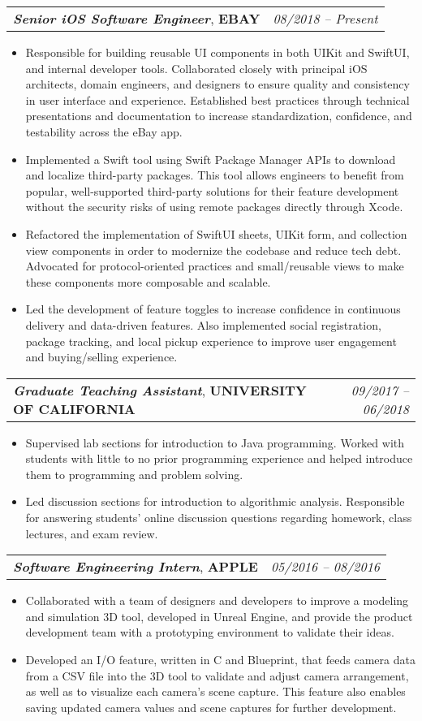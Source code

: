 \documentclass[letterpaper,11pt]{article}
\makeatletter
\newcommand{\resumeItem}[1]{
  \item \small{#1}
}
\newcommand{\resumeExperienceSubheading}[3]{
  \vspace{-1pt}\item
    \begin{tabular*}{0.97\textwidth}[t]{l@{\extracolsep{\fill}}r}
      \textbf{\textit{#1}}, \textbf{#2} & \textit{#3} \\
    \end{tabular*}\vspace{-5pt}
}
\newcommand{\resumeItemListStart}{\begin{itemize}}
\newcommand{\resumeItemListEnd}{\end{itemize}\vspace{-5pt}}
\def\CPlusPlus{{C\nolinebreak[4]\hspace{-.05em}\raisebox{.4ex}{\tiny\bf ++}}}
\makeatother
\begin{document}
    \resumeExperienceSubheading
      {Senior iOS Software Engineer}{EBAY}{08/2018 -- Present}
      \resumeItemListStart
        \resumeItem
          {Responsible for building reusable UI components in both UIKit and SwiftUI, and internal developer tools.
          Collaborated closely with principal iOS architects, domain engineers, and designers to ensure
          quality and consistency in user interface and experience. Established best practices through technical presentations 
          and documentation to increase standardization, confidence, and testability across the eBay app. }
        \resumeItem
          {Implemented a Swift tool using Swift Package Manager APIs to download and localize third-party packages. 
          This tool allows engineers to benefit from popular, well-supported third-party solutions 
          for their feature development without the security risks of using remote packages directly through Xcode.}
        \resumeItem
          {Refactored the implementation of SwiftUI sheets, UIKit form, and collection view components
          in order to modernize the codebase and reduce tech debt. Advocated for protocol-oriented practices and 
          small/reusable views to make these components more composable and scalable.}
        \resumeItem
          {Led the development of feature toggles to increase confidence in continuous delivery and data-driven features. 
          Also implemented social registration, package tracking, and local pickup experience to improve user engagement and 
          buying/selling experience.}
      \resumeItemListEnd

    \resumeExperienceSubheading
      {Graduate Teaching Assistant}{UNIVERSITY OF CALIFORNIA}{09/2017 -- 06/2018}
      \resumeItemListStart
        \resumeItem
          {Supervised lab sections for introduction to Java programming. Worked with students with little to no prior programming
          experience and helped introduce them to programming and problem solving.}
        \resumeItem
          {Led discussion sections for introduction to algorithmic analysis. Responsible for answering students' online discussion
          questions regarding homework, class lectures, and exam review.}
      \resumeItemListEnd

      \resumeExperienceSubheading
      {Software Engineering Intern}{APPLE}{05/2016 -- 08/2016}
      \resumeItemListStart
        \resumeItem
          {Collaborated with a team of designers and developers to improve a modeling and simulation 3D tool, developed in
          Unreal Engine, and provide the product development team with a prototyping environment to validate their ideas.}
        \resumeItem
          {Developed an I/O feature, written in {\CPlusPlus} and Blueprint, that feeds camera data from a CSV file into the 3D tool to
          validate and adjust camera arrangement, as well as to visualize each camera's scene capture. This feature also enables saving
          updated camera values and scene captures for further development.}
      \resumeItemListEnd
\end{document}

